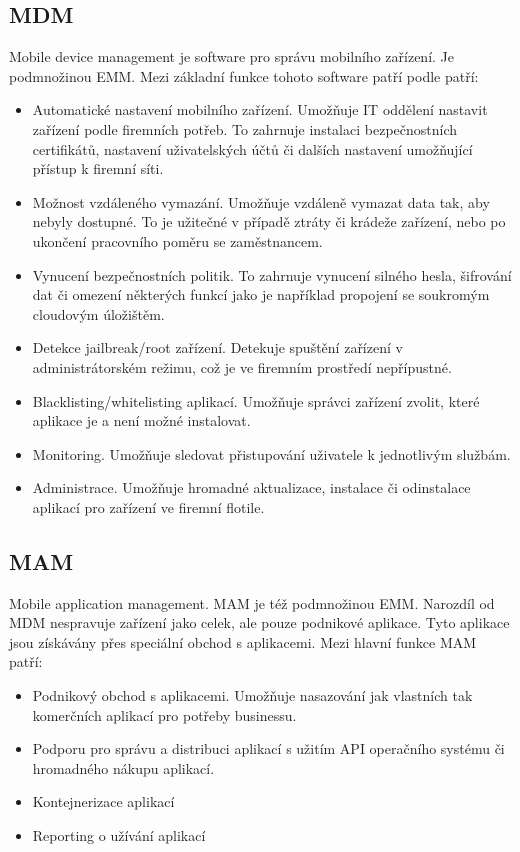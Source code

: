   \subsection{MDM}
 Mobile device management je software pro správu mobilního zařízení. Je podmnožinou EMM. Mezi základní funkce tohoto software patří podle  patří:
 \begin{itemize}
     \item Automatické nastavení mobilního zařízení. Umožňuje IT oddělení nastavit zařízení podle firemních potřeb. To zahrnuje instalaci bezpečnostních certifikátů, nastavení uživatelských účtů či dalších nastavení umožňující přístup k firemní síti.
     \item Možnost vzdáleného vymazání. Umožňuje vzdáleně vymazat data tak, aby nebyly dostupné. To je užitečné v případě ztráty či krádeže zařízení, nebo po ukončení pracovního poměru se zaměstnancem.
     \item Vynucení bezpečnostních politik. To zahrnuje vynucení silného hesla, šifrování dat či omezení některých funkcí jako je například propojení se soukromým cloudovým úložištěm. 
     \item Detekce jailbreak/root zařízení. Detekuje spuštění zařízení v administrátorském režimu, což je ve firemním prostředí nepřípustné.
     \item Blacklisting/whitelisting aplikací. Umožňuje správci zařízení zvolit, které aplikace je a není možné instalovat.
     \item Monitoring. Umožňuje sledovat přistupování uživatele k jednotlivým službám.
     \item Administrace. Umožňuje hromadné aktualizace, instalace či odinstalace aplikací pro zařízení ve firemní flotile.
 \end{itemize}
 
 
 \subsection{MAM} 
 Mobile application management. MAM je též podmnožinou EMM. Narozdíl od MDM nespravuje zařízení jako celek, ale pouze podnikové aplikace. Tyto aplikace jsou získávány přes speciální obchod s aplikacemi. Mezi hlavní funkce MAM patří:
 \begin{itemize}
     \item Podnikový obchod s aplikacemi. Umožňuje nasazování jak vlastních tak komerčních aplikací pro potřeby businessu.
     \item Podporu pro správu a distribuci aplikací s užitím API operačního systému či hromadného nákupu aplikací.
     \item Kontejnerizace aplikací
     \item Reporting o užívání aplikací
 \end{itemize}
 
